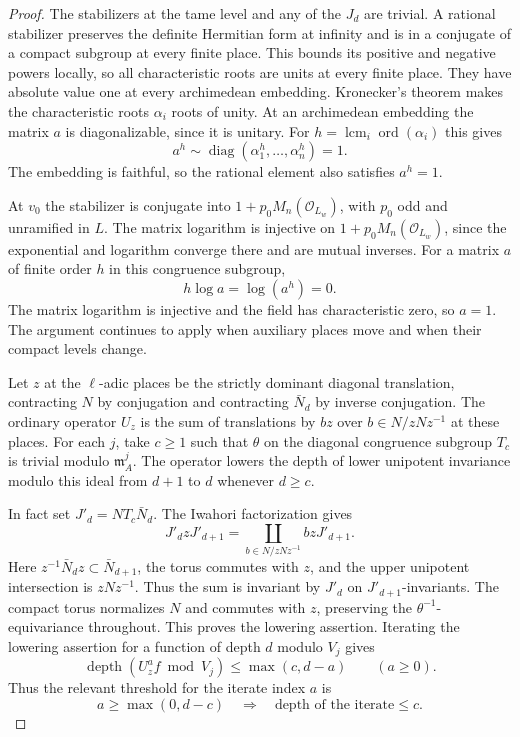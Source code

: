 \begin{proof}
The stabilizers at the tame level and any of the
\(J_d\) are trivial. A rational stabilizer preserves
the definite Hermitian form at infinity and is in a
conjugate of a compact subgroup at every finite place.
This bounds its positive and negative powers locally,
so all characteristic roots are units at every finite
place. They have absolute value one at every
archimedean embedding. Kronecker's theorem makes the characteristic roots \(\alpha_i\) roots of unity. At an archimedean embedding the matrix \(a\) is diagonalizable, since it is unitary. For \(h=\operatorname{lcm}_i\operatorname{ord}(\alpha_i)\) this gives
\[
 a^h\sim\operatorname{diag}(\alpha_1^h,\ldots,\alpha_n^h)=1 .
\]
The embedding is faithful, so the rational element also satisfies \(a^h=1\).

At \(v_0\) the stabilizer is conjugate into
\(1+p_0M_n(\mathcal O_{L_w})\), with \(p_0\) odd and
unramified in \(L\).
The matrix logarithm is injective on
\(1+p_0 M_n(\mathcal O_{L_w})\), since the exponential
and logarithm converge there and are mutual inverses.
For a matrix \(a\) of finite order \(h\) in this congruence
subgroup,
\[
                    h\log a=\log(a^h)=0.
\]
The matrix logarithm is injective and the field has characteristic
zero, so \(a=1\). The argument
continues to apply when auxiliary places move and
when their compact levels change.

Let \(z\) at the \(\ell\)-adic places be the
strictly dominant diagonal translation, contracting
\(N\) by conjugation and contracting \(\bar N_d\) by
inverse conjugation. The ordinary operator \(U_z\)
is the sum of translations by \(b z\) over
\(b\in N/zNz^{-1}\) at these places. For each
\(j\), take \(c\ge1\) such that \(\theta\) on the diagonal
congruence subgroup \(T_c\) is trivial modulo
\(\mathfrak m_A^j\). The operator lowers the depth of
lower unipotent invariance modulo this ideal from
\(d+1\) to \(d\) whenever \(d\ge c\).

In fact set \(J'_d=N T_c\bar N_d\).
The Iwahori factorization gives
\[
 J'_d z J'_{d+1}
   =\coprod_{b\in N/zNz^{-1}} b z J'_{d+1}.
\]
Here \(z^{-1}\bar N_d z\subset\bar N_{d+1}\),
the torus commutes with \(z\), and the upper
unipotent intersection is \(zNz^{-1}\). Thus
the sum is invariant by \(J'_d\) on
\(J'_{d+1}\)-invariants. The compact torus normalizes
\(N\) and commutes with \(z\), preserving the
\(\theta^{-1}\)-equivariance throughout. This proves
the lowering assertion. Iterating the lowering assertion for a function of depth \(d\) modulo \(V_j\) gives
\[
 \operatorname{depth}(U_z^a f\bmod V_j)\le\max(c,d-a)
 \qquad (a\ge0).
\]
Thus the relevant threshold for the iterate index \(a\) is
\[
 a\ge\max(0,d-c)\quad\Longrightarrow\quad \text{depth of the iterate}\le c.
\]



\end{proof}
